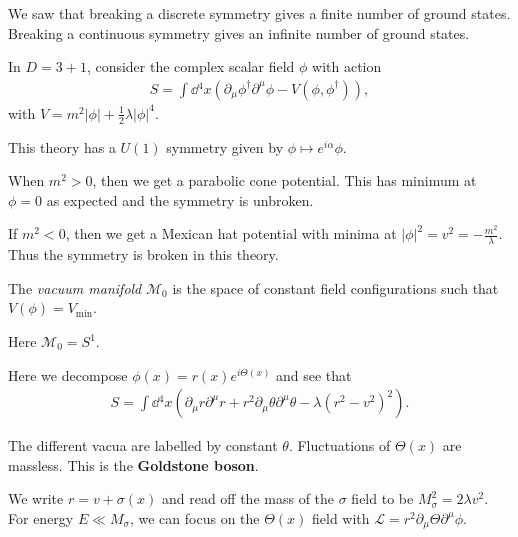 
We saw that breaking a discrete symmetry gives a finite number of ground states. Breaking a continuous symmetry gives an infinite number of ground states.

In $D = 3 + 1$, consider the complex scalar field $\phi$ with action
\begin{align}
    S = \int \dd{^{4}x} \left( \partial_\mu \phi^{\dag} \partial^{\mu} \phi - V \left( \phi, \phi^{\dag} \right)  \right) 
,\end{align}
with $V = m^2 \left| \phi \right| + \frac{1}{2}\lambda \left| \phi \right|^{4}$.

This theory has a $U\left( 1 \right) $ symmetry given by $\phi \mapsto e^{i\alpha }\phi$.

When $m^2 > 0$, then we get a parabolic cone potential. This has minimum at $\phi = 0$ as expected and the symmetry is unbroken.


If $m^2 < 0$, then we get a Mexican hat potential with minima at $\left| \phi \right|^2 = v^2 = -\frac{m^2}{\lambda}$. Thus the symmetry is broken in this theory.


\begin{definition}
    The \emph{vacuum manifold} $\mathcal{M}_0$ is the space of constant field configurations such that $V \left( \phi \right) = V_\text{min}$. 

\end{definition}

Here $\mathcal{M}_0 = S^{1}$. 


Here we decompose $\phi \left( x \right) = r\left( x \right) e^{i \Theta \left( x \right) }$ and see that
\begin{align}
    S = \int \dd{^{4}x} \left( \partial_\mu r \partial^{\mu} r + r^2 \partial_\mu \theta \partial^{\mu} \theta - \lambda \left( r^2 - v^2 \right)^2\right) 
.\end{align}

The different vacua are labelled by constant $\theta$. Fluctuations of $\Theta \left( x \right) $ are massless. This is the \textbf{Goldstone boson}.

We write $r = v + \sigma \left( x \right)$ and read off the mass of the $\sigma$ field to be $M_\sigma^2 = 2 \lambda v^2$. For energy $E \ll M_\sigma$, we can focus on the $\Theta \left( x \right) $ field with $\mathcal{L} = r^2 \partial_\mu \Theta \partial^{\mu} \phi$.


